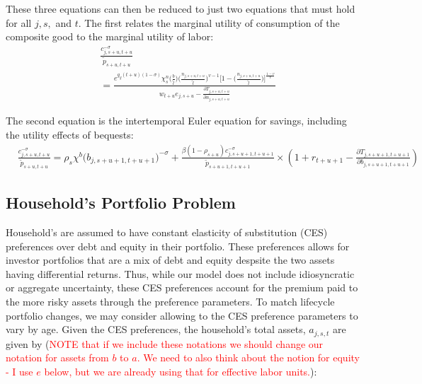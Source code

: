     These three equations can then be reduced to just two equations that must hold for all $j,s,$ and $t$.  The first relates the marginal utility of consumption of the composite good to the marginal utility of labor:
    \begin{equation}\label{EqcEuler}
      \begin{split}
      & \frac{ c_{j,s+u,t+u}^{-\sigma}}{\tilde{p}_{s+u,t+u}} \\
      & = \frac{ e^{g_y (t+u)(1-\sigma)}\chi^n_{s}\biggl(\frac{b}{\tilde{l}}\biggr)\biggl(\frac{n_{j,s+u,t+u}}{\tilde{l}}\biggr)^{v-1}\Biggl[1 - \biggl(\frac{n_{j,s+u,t+u}}{\tilde{l}}\biggr)\Biggr]^{\frac{1-v}{v}} } { w_{t+u} e_{j,s+u} - \frac{\partial T_{j,s+u,t+u}}{\partial n_{j,s+u,t+u}} }
       \end{split}
    \end{equation}

    \noindent\noindent The second equation is the intertemporal Euler equation for savings, including the utility effects of bequests:
    \begin{equation}\label{EqbEuler}
      \begin{split}
      & \frac{ c_{j,s+u,t+u}^{-\sigma}}{\tilde{p}_{s+u,t+u}} = \rho_s\chi^b\bigl(b_{j,s+u+1,t+u+1}\bigr)^{-\sigma}  + \frac{ \beta(1-\rho_{s+u}) c_{j,s+u+1,t+u+1}^{-\sigma}} {\tilde{p}_{s+u+1,t+u+1}} \times \left( 1 + r_{t+u+1} - \frac{\partial T_{j,s+u+1,t+u+1}}{\partial b_{j,s+u+1,t+u+1}} \right)
      \end{split}
    \end{equation}

   
    \subsection{Household's Portfolio Problem}\label{sec:portfolio}
    
Household's are assumed to have constant elasticity of substitution (CES) preferences over debt and equity in their portfolio.  These preferences allows for investor portfolios that are a mix of debt and equity despsite the two assets having differential returns.  Thus, while our model does not include idiosyncratic or aggregate uncertainty, these CES preferences account for the premium paid to the more risky assets through the preference parameters. To match lifecycle portfolio changes, we may consider allowing to the CES preference parameters to vary by age.  Given the CES preferences, the household's total assets, $a_{j,s,t}$ are given by (\textcolor{red}{NOTE that if we include these notations we should change our notation for assets from $b$ to $a$. We need to also think about the notion for equity - I use $e$ below, but we are already using that for effective labor units.}): 

